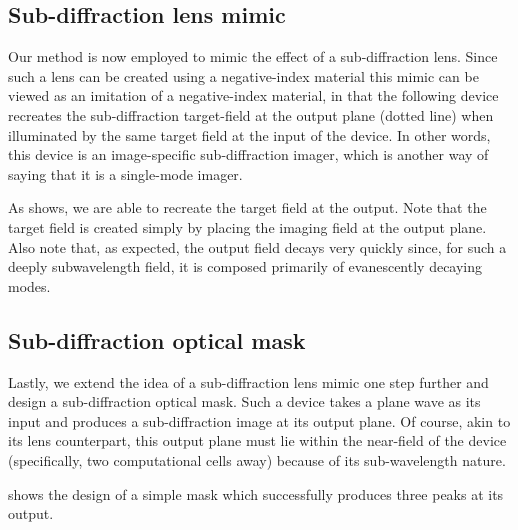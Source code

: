 \subsection{Sub-diffraction lens mimic}
Our method is now employed to mimic the effect of a sub-diffraction lens.
Since such a lens can be created using a negative-index material
    this mimic can be viewed as an imitation of a negative-index material,
    in that the following device recreates the sub-diffraction target-field 
    at the output plane (dotted line)
    when illuminated by the same target field at the input of the device.
In other words,
    this device is an image-specific sub-diffraction imager,
    which is another way of saying that it is a single-mode imager.

As  shows,
   we are able to recreate the target field at the output.
Note that the target field is created simply by placing 
    the imaging field at the output plane.
Also note that, as expected, 
    the output field decays very quickly since,
    for such a deeply subwavelength field,
    it is composed primarily of evanescently decaying modes.

\subsection{Sub-diffraction optical mask}
Lastly, we extend the idea of a sub-diffraction lens mimic
    one step further and
    design a sub-diffraction optical mask.
Such a device takes a plane wave as its input and
    produces a sub-diffraction image at its output plane.
Of course, akin to its lens counterpart,
    this output plane must lie within the near-field 
    of the device (specifically, two computational cells away)
    because of its sub-wavelength nature.

 shows the design of a simple mask which 
    successfully produces three peaks at its output.

